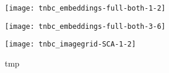 \begin{figure}
\centering
  \texttt{[image: tnbc\_embeddings-full-both-1-2]}
  \caption{}
  \label{fig:tnbc_embeddings-full-both-1-2}
\end{figure}

\begin{figure}
\centering
  \texttt{[image: tnbc\_embeddings-full-both-3-6]}
  \caption{}
  \label{fig:tnbc_embeddings-full-both-3-6}
\end{figure}

\begin{figure}
\centering
  \texttt{[image: tnbc\_imagegrid-SCA-1-2]}
  \caption{tmp}
  \label{fig:tnbc_imagegrid-SCA-1-2}
\end{figure}

